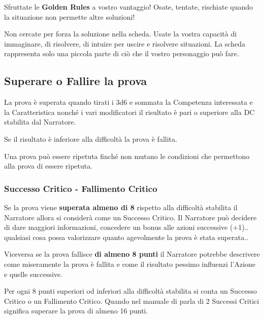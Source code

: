 \begin{multicols}{2}
\begin{itemize}[leftmargin=*]
\end{itemize}

Sfruttate le \textbf{Golden Rules} a vostro vantaggio! Osate, tentate, rischiate quando la situazione non permette altre soluzioni!

\begin{giocatore}{
Non cercate per forza la soluzione nella scheda. Usate la vostra capacità di immaginare, di risolvere, di intuire per uscire e risolvere situazioni. La scheda rappresenta solo una piccola parte di ciò che il vostro personaggio può fare.
}\end{giocatore}

\subsection{Superare o Fallire la prova}\label{superareofallirelaprova}

La prova è superata quando tirati i 3d6 e sommata la Competenza interessata e la Caratteristica nonché i vari modificatori il risultato è pari o superiore alla DC stabilita dal Narratore.

Se il risultato è inferiore alla difficoltà la prova è fallita.

Una prova può essere ripetuta finché non mutano le condizioni che permettono alla prova di essere ripetuta.

\subsubsection{Successo Critico - Fallimento Critico}

Se la prova viene \textbf{superata almeno di 8} rispetto alla difficoltà stabilita il Narratore allora si considerà come un Successo Critico.
Il Narratore può decidere di dare maggiori informazioni, concedere un bonus alle azioni successive (+1).. qualsiasi cosa possa valorizzare quanto agevolmente la prova è stata superata..

Viceversa se la prova fallisce \textbf{di almeno 8 punti} il Narratore potrebbe descrivere come miseramente la prova è fallita e come il risultato pessimo influenzi l'Azione e quelle successive.

Per ogni 8 punti superiori od inferiori alla difficoltà stabilita si conta un Successo Critico o un Fallimento Critico.  Quando nel manuale di parla di 2 Successi Critici significa superare la prova di almeno 16 punti.


\end{multicols}
